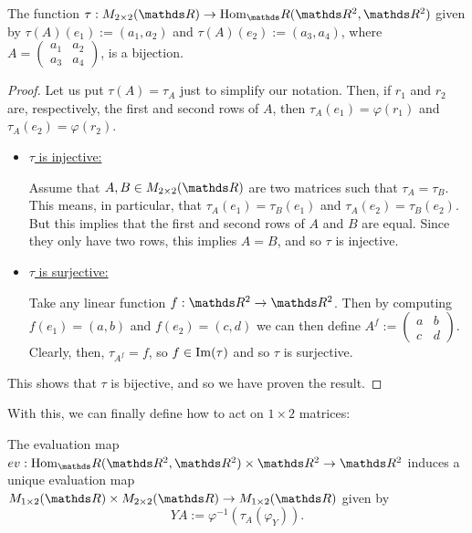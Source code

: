 \begin{prop}
	The function $\tau: M_{2\times 2}(\R)\to\hom_\R(\R^2,\R^2)$ given by $\tau(A)(e_1):=(a_1,a_2)$ and $\tau(A)(e_2):=(a_3,a_4)$, where $A=\begin{pmatrix}
	a_1&a_2\\a_3&a_4
	\end{pmatrix}$, is a bijection.
\end{prop}
\begin{proof}
	Let us put $\tau(A)=\tau_A$ just to simplify our notation. Then, if $r_1$ and $r_2$ are, respectively, the first and second rows of $A$, then $\tau_A(e_1)=\varphi(r_1)$ and $\tau_A(e_2)=\varphi(r_2)$.
	
	
	
	\begin{itemize}
		\item \underline{$\tau$ is injective:}
		
		Assume that $A,B\in M_{2\times 2}(\R)$ are two matrices such that $\tau_A=\tau_B$. This means, in particular, that $\tau_A(e_1)=\tau_B(e_1)$ and $\tau_A(e_2)=\tau_B(e_2)$. But this implies that the first and second rows of $A$ and $B$ are equal. Since they only have two rows, this implies $A=B$, and so $\tau$ is injective.
		
		\item \underline{$\tau$ is surjective:}
		
		Take any linear function $f:\R^2\to \R^2$. Then by computing $f(e_1)=(a,b)$ and $f(e_2)=(c,d)$ we can then define $A^f:=\begin{pmatrix}
		a&b\\c&d
		\end{pmatrix}$. Clearly, then, $\tau_{A^f}=f$, so $f\in\operatorname{Im}(\tau)$ and so $\tau$ is surjective.
	\end{itemize}
	
	This shows that $\tau$ is bijective, and so we have proven the result.
\end{proof}

With this, we can finally define how to act on $1\times 2$ matrices:

\begin{df}
	The evaluation map $ev:\hom_\R(\R^2,\R^2)\times\R^2\to \R^2$ induces a unique evaluation map $M_{1\times 2}(\R)\times M_{2\times 2}(\R)\to M_{1\times 2}(\R)$ given by
	\[YA:=\varphi^{-1}(\tau_A(\varphi_Y)).\]
\end{df}

